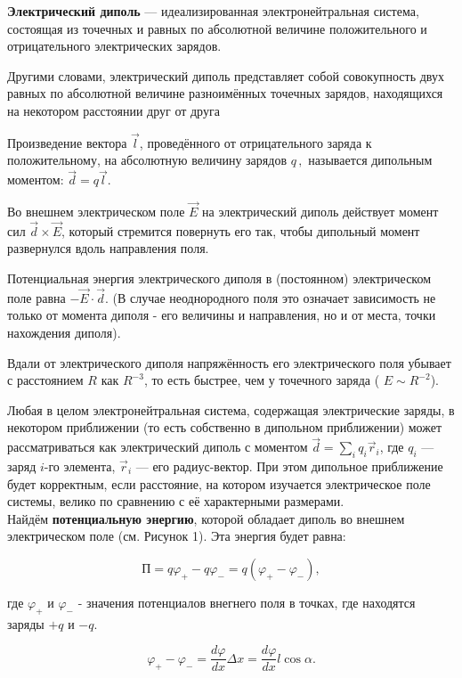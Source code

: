 \documentclass[__main__.tex]{subfiles}
\begin{document}
\textbf{Электрический диполь} — идеализированная электронейтральная система, состоящая из точечных и равных по абсолютной величине положительного и отрицательного электрических зарядов.

Другими словами, электрический диполь представляет собой совокупность двух равных по абсолютной величине разноимённых точечных зарядов, находящихся на некотором расстоянии друг от друга

Произведение вектора $ \vec l$, проведённого от отрицательного заряда к положительному, на абсолютную величину зарядов $ q\,,$ называется дипольным моментом: $\vec d=q\vec l$.

Во внешнем электрическом поле $\vec E$ на электрический диполь действует момент сил ${\vec d}\times{\vec E}$, который стремится повернуть его так, чтобы дипольный момент развернулся вдоль направления поля.

Потенциальная энергия электрического диполя в (постоянном) электрическом поле равна $-{\vec E}\cdot{\vec d}$. (В случае неоднородного поля это означает зависимость не только от момента диполя - его величины и направления, но и от места, точки нахождения диполя).

Вдали от электрического диполя напряжённость его электрического поля убывает с расстоянием $R$ как $R^{-3}$, то есть быстрее, чем у точечного заряда ( $E \sim R^{-2}$).

Любая в целом электронейтральная система, содержащая электрические заряды, в некотором приближении (то есть собственно в дипольном приближении) может рассматриваться как электрический диполь с моментом $\vec d = \sum_i q_i {\vec r}_i$, где $q_{i}$ — заряд $i$-го элемента, ${\vec r}_i$ — его радиус-вектор. При этом дипольное приближение будет корректным, если расстояние, на котором изучается электрическое поле системы, велико по сравнению с её характерными размерами.
\\
Найдём \textbf{потенциальную энергию}, которой обладает диполь во внешнем электрическом поле (см. Рисунок 1). Эта энергия будет равна:

\begin{equation}
\textit{П} = q\varphi_+ - q\varphi_- = q(\varphi_+ - \varphi_-),
\end{equation}

где $\varphi_+$ и $\varphi_-$ - значения потенциалов внегнего поля в точках, где находятся заряды $+q$ и $-q$.

\begin{equation}
\varphi_+ - \varphi_- = \frac{d\varphi}{dx} \Delta x = \frac{d\varphi}{dx} l \cos \alpha.
\end{equation}
\end{document}
